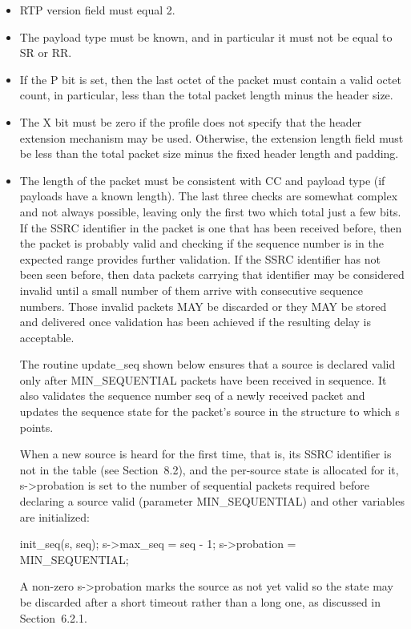 \documentclass{article}
\begin{document}
\begin{itemize}
\item RTP version field must equal 2.
\item The payload type must be known, and in particular it must not be equal to SR or RR.
\item If the P bit is set, then the last octet of the packet must contain a valid octet count, in particular, less than the total packet length minus the header size.
\item The X bit must be zero if the profile does not specify that the header extension mechanism may be used.  Otherwise, the extension length field must be less than the total packet size minus the fixed header length and padding.
\item The length of the packet must be consistent with CC and payload type (if payloads have a known length).
The last three checks are somewhat complex and not always possible, leaving only the first two which total just a few bits.  If the SSRC identifier in the packet is one that has been received before, then the packet is probably valid and checking if the sequence number is in the expected range provides further validation.  If the SSRC identifier has not been seen before, then data packets carrying that identifier may be considered invalid until a small number of them arrive with consecutive sequence numbers.  Those invalid packets MAY be discarded or they MAY be stored and delivered once validation has been achieved if the resulting delay is acceptable.

The routine update\_seq shown below ensures that a source is declared valid only after MIN\_SEQUENTIAL packets have been received in sequence.  It also validates the sequence number seq of a newly received packet and updates the sequence state for the packet's source in the structure to which s points.

When a new source is heard for the first time, that is, its SSRC identifier is not in the table (see Section~8.2), and the per-source state is allocated for it, s->probation is set to the number of sequential packets required before declaring a source valid (parameter MIN\_SEQUENTIAL) and other variables are initialized:

init\_seq(s, seq); s->max\_seq = seq - 1; s->probation = MIN\_SEQUENTIAL;

A non-zero s->probation marks the source as not yet valid so the state may be discarded after a short timeout rather than a long one, as discussed in Section~6.2.1.


\end{itemize}
\end{document}

